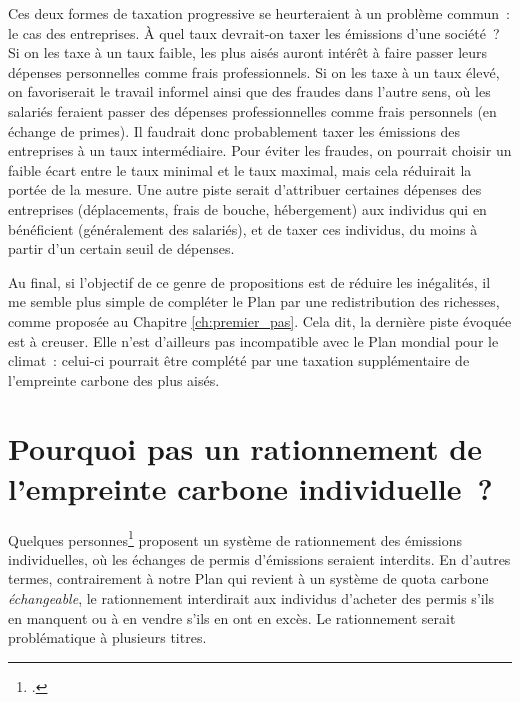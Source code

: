 \documentclass[a5paper,french,openany]{memoir}
\begin{document}
Ces deux formes de taxation progressive se heurteraient à un problème commun~: le cas des entreprises. À quel taux devrait-on taxer les émissions d'une société~? Si on les taxe à un taux faible, les plus aisés auront intérêt à faire passer leurs dépenses personnelles comme frais professionnels. Si on les taxe à un taux élevé, on favoriserait le travail informel ainsi que des fraudes dans l'autre sens, où les salariés feraient passer des dépenses professionnelles comme frais personnels (en échange de primes). Il faudrait donc probablement taxer les émissions des entreprises à un taux intermédiaire. Pour éviter les fraudes, on pourrait choisir un faible écart entre le taux minimal et le taux maximal, mais cela réduirait la portée de la mesure. Une autre piste serait d'attribuer certaines dépenses des entreprises (déplacements, frais de bouche, hébergement) aux individus qui en bénéficient (généralement des salariés), et de taxer ces individus, du moins à partir d'un certain seuil de dépenses. 

Au final, si l'objectif de ce genre de propositions est de réduire les inégalités, il me semble plus simple de compléter le Plan par une redistribution des richesses, comme proposée au Chapitre \ref{ch:premier_pas}. Cela dit, la dernière piste évoquée est à creuser. Elle n'est d'ailleurs pas incompatible avec le Plan mondial pour le climat~: celui-ci pourrait être complété par une taxation supplémentaire de l'empreinte carbone des plus aisés. 

\section*{\normalsize Pourquoi pas un rationnement de l'empreinte carbone individuelle~?}\label{q:rationnement}

Quelques %
personnes\footnote{\cite{wood_rationing_2023}.} proposent un système de rationnement des émissions individuelles, où les échanges de permis d'émissions seraient interdits. En d'autres termes, contrairement à notre Plan qui revient à un système de quota carbone \textit{échangeable}, le rationnement interdirait aux individus d'acheter des permis s'ils en manquent ou à en vendre s'ils en ont en excès. %
Le rationnement serait problématique à plusieurs titres. 
\end{document}
